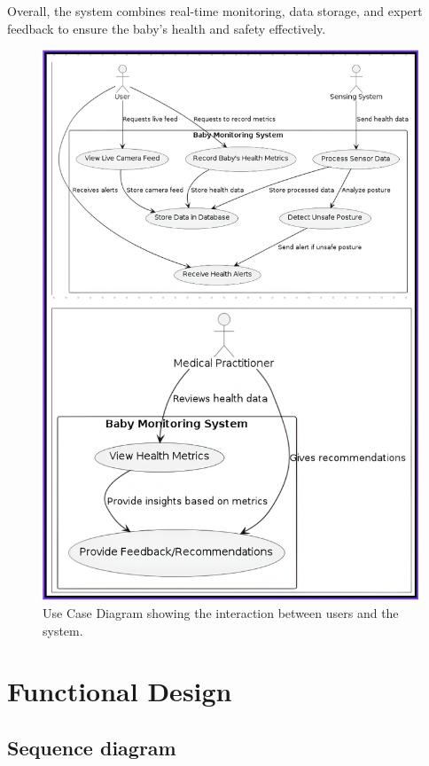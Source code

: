 \documentclass[12pt,a4paper]{report}
\begin{document}
Overall, the system combines real-time monitoring, data storage, and expert feedback to ensure the baby’s health and safety effectively.

\begin{figure}[hbtp]
  \centering
  \includegraphics[scale=0.8]{./pic/Use case.png}
  \caption{Use Case Diagram showing the interaction between users and the system.}
  \label{fig:usecase}
\end{figure}
\section{Functional Design}
\subsection{Sequence diagram}
\end{document}
